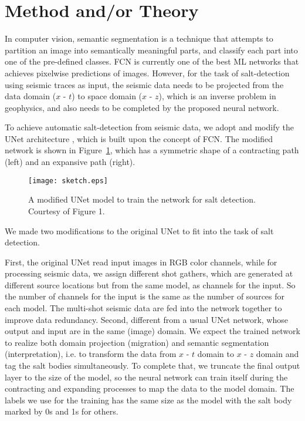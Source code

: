 \documentclass{cph18}
\begin{document}
\section{Method and/or Theory}
In computer vision, semantic segmentation is a technique that attempts to partition an image into semantically meaningful parts, and classify each part into one of the pre-defined classes. FCN is currently one of the best ML networks that achieves pixelwise predictions of images. However, for the task of salt-detection using seismic traces as input, the seismic data needs to be projected from the data domain ($x$ - $t$) to space domain ($x$ - $z$), which is an inverse problem in geophysics, and also needs to be completed by the proposed neural network.

To achieve automatic salt-detection from seismic data, we adopt and modify the UNet architecture \citep{ronneberger15}, which is built upon the concept of FCN. The modified network is shown in Figure~\ref{fig:sketch2}, which has a symmetric shape of a contracting path (left) and an expansive path (right).
\begin{figure}[!htb]
  \centering
  \texttt{[image: sketch.eps]}
  \caption{A modified UNet model to train the network for salt detection. Courtesy of \citet{ronneberger15} Figure 1.}
\label{fig:sketch2}
\end{figure}
We made two modifications to the original UNet to fit into the task of salt detection. 

First, the original UNet read input images in RGB color channels, while for processing seismic data, we assign different shot gathers, which are generated at different source locations but from the same model, as channels for the input. So the number of channels for the input is the same as the number of sources for each model. The multi-shot seismic data are fed into the network together to improve data redundancy. Second, different from a usual UNet network, whose output and input are in the same (image) domain. We expect the trained network to realize both domain projection (migration) and semantic segmentation (interpretation), i.e. to transform the data from $x$ - $t$ domain to $x$ - $z$ domain and tag the salt bodies simultaneously. To complete that, we truncate the final output layer to the size of the model, so the neural network can train itself during the contracting and expanding processes to map the data to the model domain.
The labels we use for the training has the same size as the model with the salt body marked by 0s and 1s for others.
\end{document}
